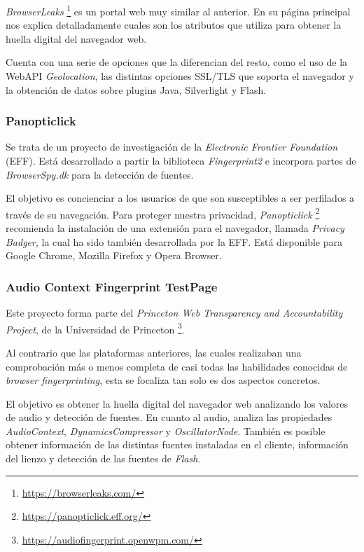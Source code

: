 \textit{BrowserLeaks} \footnote{\url{https://browserleaks.com/}} es un portal web muy similar al anterior. En su página principal nos explica detalladamente cuales son los atributos que utiliza para obtener la huella digital del navegador web. \par 

Cuenta con una serie de opciones que la diferencian del resto, como el uso de la WebAPI \textit{Geolocation}, las distintas opciones SSL/TLS que soporta el navegador y la obtención de datos sobre plugins Java, Silverlight y Flash. \par 

\subsubsection{Panopticlick}

Se trata de un proyecto de investigación de la \textit{Electronic Frontier Foundation} (EFF). Está desarrollado a partir la biblioteca \textit{Fingerprint2} \cite{fingerprintjs2} e incorpora partes de \textit{BrowserSpy.dk} \cite{browserSpy} para la detección de fuentes. \par 

El objetivo es concienciar a los usuarios de que son susceptibles a ser perfilados a través de su navegación. Para proteger nuestra privacidad, \textit{Panopticlick} \footnote{\url{https://panopticlick.eff.org/}} recomienda la instalación de una extensión para el navegador, llamada \textit{Privacy Badger}, la cual ha sido también desarrollada por la EFF. Está disponible para Google Chrome, Mozilla Firefox y Opera Browser. \par 

\subsubsection{Audio Context Fingerprint TestPage}

Este proyecto forma parte del \textit{Princeton Web Transparency and Accountability Project}, de la Universidad de Princeton \footnote{\url{https://audiofingerprint.openwpm.com/}}. \par 

Al contrario que las plataformas anteriores, las cuales realizaban una comprobación más o menos completa de casi todas las habilidades conocidas de \textit{browser fingerprinting}, esta se focaliza tan solo es dos aspectos concretos. \par

El objetivo es obtener la huella digital del navegador web analizando los valores de audio y detección de fuentes. En cuanto al audio, analiza las propiedades \textit{AudioContext}, \textit{DynamicsCompressor} y \textit{OscillatorNode}. También es posible obtener información de las distintas fuentes instaladas en el cliente, información del lienzo y detección de las fuentes de \textit{Flash}. \par 

